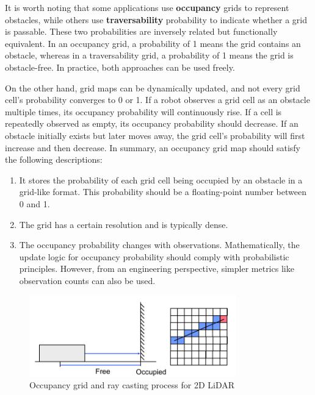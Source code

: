 It is worth noting that some applications use \textbf{occupancy} grids to represent obstacles, while others use \textbf{traversability} probability to indicate whether a grid is passable. These two probabilities are inversely related but functionally equivalent. In an occupancy grid, a probability of 1 means the grid contains an obstacle, whereas in a traversability grid, a probability of 1 means the grid is obstacle-free. In practice, both approaches can be used freely.  

On the other hand, grid maps can be dynamically updated, and not every grid cell's probability converges to 0 or 1. If a robot observes a grid cell as an obstacle multiple times, its occupancy probability will continuously rise. If a cell is repeatedly observed as empty, its occupancy probability should decrease. If an obstacle initially exists but later moves away, the grid cell's probability will first increase and then decrease. In summary, an occupancy grid map should satisfy the following descriptions:  

\begin{enumerate}  
	\item It stores the probability of each grid cell being occupied by an obstacle in a grid-like format. This probability should be a floating-point number between 0 and 1.  
	\item The grid has a certain resolution and is typically dense.  
	\item The occupancy probability changes with observations. Mathematically, the update logic for occupancy probability should comply with probabilistic principles. However, from an engineering perspective, simpler metrics like observation counts can also be used.  
\end{enumerate}  

\begin{figure}[!htp]  
	\centering  
	\includegraphics[width=0.8\textwidth]{resources/2d-lidar-mapping/grid-and-casting.pdf}  
	\caption{Occupancy grid and ray casting process for 2D LiDAR}  
	\label{fig:grid-and-casting}  
\end{figure}  

